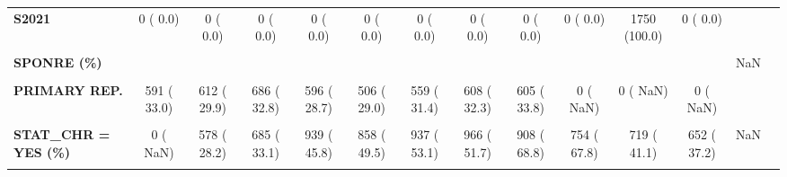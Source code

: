 \documentclass[
]{article}
\begin{document}
\begin{table}[H]
\begin{tabular}[t]{>{\raggedright\arraybackslash}p{5em}ccccccccccccc}
\textbf{S2021} & 0 (  0.0) & 0 (  0.0) & 0 (  0.0) & 0 (  0.0) & 0 (  0.0) & 0 (  0.0) & 0 (  0.0) & 0 (  0.0) & 0 (  0.0) & 1750 (100.0) & 0 (  0.0) &  & \\
\textbf{\cellcolor{gray!10}{S2024}} & \cellcolor{gray!10}{0 (  0.0)} & \cellcolor{gray!10}{0 (  0.0)} & \cellcolor{gray!10}{0 (  0.0)} & \cellcolor{gray!10}{0 (  0.0)} & \cellcolor{gray!10}{0 (  0.0)} & \cellcolor{gray!10}{0 (  0.0)} & \cellcolor{gray!10}{0 (  0.0)} & \cellcolor{gray!10}{0 (  0.0)} & \cellcolor{gray!10}{0 (  0.0)} & \cellcolor{gray!10}{0 (  0.0)} & \cellcolor{gray!10}{1755 (100.0)} & \cellcolor{gray!10}{} & \cellcolor{gray!10}{}\\
\textbf{SPONRE (\%)} &  &  &  &  &  &  &  &  &  &  &  & NaN & \\
\textbf{\cellcolor{gray!10}{NONE}} & \cellcolor{gray!10}{1156 ( 64.5)} & \cellcolor{gray!10}{1348 ( 65.8)} & \cellcolor{gray!10}{1316 ( 62.8)} & \cellcolor{gray!10}{1338 ( 64.5)} & \cellcolor{gray!10}{1096 ( 62.8)} & \cellcolor{gray!10}{1127 ( 63.4)} & \cellcolor{gray!10}{1222 ( 64.8)} & \cellcolor{gray!10}{1149 ( 64.2)} & \cellcolor{gray!10}{0 (  NaN)} & \cellcolor{gray!10}{0 (  NaN)} & \cellcolor{gray!10}{0 (  NaN)} & \cellcolor{gray!10}{} & \cellcolor{gray!10}{}\\
\textbf{PRIMARY REP.} & 591 ( 33.0) & 612 ( 29.9) & 686 ( 32.8) & 596 ( 28.7) & 506 ( 29.0) & 559 ( 31.4) & 608 ( 32.3) & 605 ( 33.8) & 0 (  NaN) & 0 (  NaN) & 0 (  NaN) &  & \\
\textbf{\cellcolor{gray!10}{SPONTANEOUS REP.}} & \cellcolor{gray!10}{46 (  2.6)} & \cellcolor{gray!10}{88 (  4.3)} & \cellcolor{gray!10}{92 (  4.4)} & \cellcolor{gray!10}{141 (  6.8)} & \cellcolor{gray!10}{144 (  8.2)} & \cellcolor{gray!10}{93 (  5.2)} & \cellcolor{gray!10}{55 (  2.9)} & \cellcolor{gray!10}{37 (  2.1)} & \cellcolor{gray!10}{0 (  NaN)} & \cellcolor{gray!10}{0 (  NaN)} & \cellcolor{gray!10}{0 (  NaN)} & \cellcolor{gray!10}{} & \cellcolor{gray!10}{}\\
\textbf{STAT\_CHR = YES (\%)} & 0 (  NaN) & 578 ( 28.2) & 685 ( 33.1) & 939 ( 45.8) & 858 ( 49.5) & 937 ( 53.1) & 966 ( 51.7) & 908 ( 68.8) & 754 ( 67.8) & 719 ( 41.1) & 652 ( 37.2) & NaN & \\
\textbf{\cellcolor{gray!10}{STENT = YES (\%)}} & \cellcolor{gray!10}{496 ( 73.7)} & \cellcolor{gray!10}{816 ( 81.4)} & \cellcolor{gray!10}{1027 ( 86.4)} & \cellcolor{gray!10}{1201 ( 92.5)} & \cellcolor{gray!10}{1088 ( 90.9)} & \cellcolor{gray!10}{1152 ( 90.8)} & \cellcolor{gray!10}{1199 ( 91.9)} & \cellcolor{gray!10}{1212 ( 94.0)} & \cellcolor{gray!10}{1077 ( 95.2)} & \cellcolor{gray!10}{1297 ( 93.9)} & \cellcolor{gray!10}{1246 ( 91.4)} & \cellcolor{gray!10}{<0.001} & \cellcolor{gray!10}{}\\

\end{tabular}
\end{table}
\end{document}
